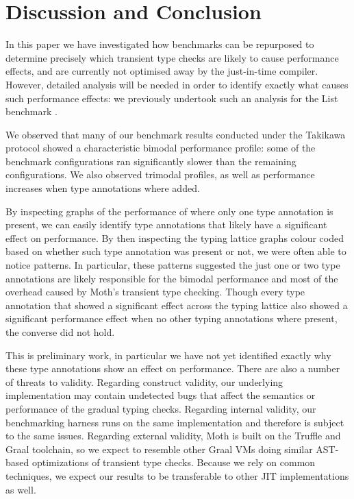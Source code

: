 \documentclass[sigplan,screen]{acmart}
\newcommand{\RR}[1]{{\color{red}RR: #1}}
\begin{document}
\section{Discussion and Conclusion}
\label{s-concl}

In this paper we have investigated how benchmarks can be
repurposed to determine precisely which transient type checks are
likely to cause performance effects,
and are currently not optimised away by the just-in-time compiler.
However, detailed analysis will be needed in order to identify exactly what causes such performance effects: we previously undertook such an analysis for the List benchmark \cite{roberts-and-co-ecoop-2019}.

We observed that many of our benchmark results
conducted under the Takikawa protocol 
showed a characteristic bimodal performance profile: some
of the benchmark configurations ran significantly slower than
the remaining configurations. We also observed trimodal profiles, as well as performance increases when type annotations where added.

By inspecting graphs of the performance of where only one type annotation is present, we can easily identify type annotations that likely have a significant effect on performance. By then inspecting the typing lattice graphs colour coded based on whether such type annotation was present or not, we were often able to notice patterns.
In particular, these patterns suggested the just one or two type annotations are likely responsible for the bimodal performance and most of the overhead caused by Moth's transient type checking.
Though every type annotation that showed a significant effect across the typing lattice also showed a significant performance effect when no other typing annotations where present, the converse did not hold.

This is preliminary work, in particular we have not yet identified exactly why these type annotations show an effect on performance.
There are also a number of threats to validity. 
Regarding construct validity, 
our underlying
implementation may contain undetected bugs that affect the semantics
or performance of the gradual typing checks. Regarding internal
validity,
our benchmarking harness runs on the same implementation
and therefore is subject to the same issues.
Regarding external validity, 
Moth is built
on the Truffle and Graal toolchain, so we expect
to resemble other Graal
VMs doing similar AST-based optimizations of transient type checks.
Because we rely on common techniques, 
we expect our results to be transferable to other JIT implementations as well.
\end{document}
